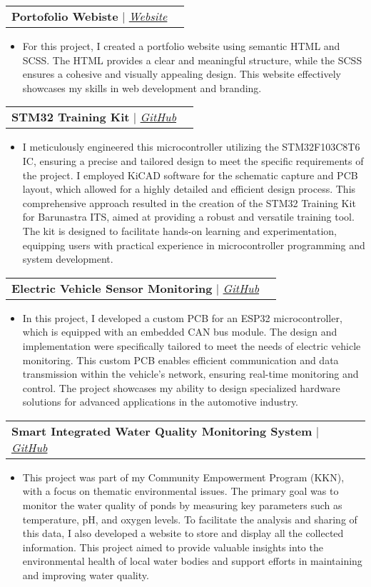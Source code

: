 \documentclass[letterpaper,11pt]{article}
\makeatletter
\newcommand{\resumeItem}[1]{
  \item\small{
    {#1 \vspace{-2pt}}
  }
}
\newcommand{\resumeProjectHeading}[2]{
    \vspace{-2pt}\item
    \begin{tabular*}{0.97\textwidth}{l@{\extracolsep{\fill}}r}
      \small#1 & #2 \\
    \end{tabular*}\vspace{-7pt}
}
\newcommand{\resumeItemListStart}{\begin{itemize}}
\newcommand{\resumeItemListEnd}{\end{itemize}\vspace{-5pt}}
\makeatother
\begin{document}
      \resumeProjectHeading
        {\textbf{Portofolio Webiste} $|$ \emph{\href{https://robotjaol.vercel.app/}{\color{blue}Website}}}{}
          \resumeItemListStart
            \resumeItem{For this project, I created a portfolio website using semantic HTML and SCSS. The HTML provides a clear and meaningful structure, while the SCSS ensures a cohesive and visually appealing design. This website effectively showcases my skills in web development and branding.}
          \resumeItemListEnd
      
      \resumeProjectHeading
        {\textbf{STM32 Training Kit} $|$ \emph{\href{https://github.com/robotjaol/STM32_Training_Kit}{\color{blue}GitHub}}}{}
          \resumeItemListStart
            \resumeItem{I meticulously engineered this microcontroller utilizing the STM32F103C8T6 IC, ensuring a precise and tailored design to meet the specific requirements of the project. I employed KiCAD software for the schematic capture and PCB layout, which allowed for a highly detailed and efficient design process. This comprehensive approach resulted in the creation of the STM32 Training Kit for Barunastra ITS, aimed at providing a robust and versatile training tool. The kit is designed to facilitate hands-on learning and experimentation, equipping users with practical experience in microcontroller programming and system development.}
          \resumeItemListEnd
          
     \resumeProjectHeading
        {\textbf{Electric Vehicle Sensor Monitoring} $|$ \emph{\href{https://github.com/robotjaol/esp32_breakout_board}{\color{blue}GitHub}}}{}
          \resumeItemListStart
            \resumeItem{In this project, I developed a custom PCB for an ESP32 microcontroller, which is equipped with an embedded CAN bus module. The design and implementation were specifically tailored to meet the needs of electric vehicle monitoring. This custom PCB enables efficient communication and data transmission within the vehicle's network, ensuring real-time monitoring and control. The project showcases my ability to design specialized hardware solutions for advanced applications in the automotive industry.}
          \resumeItemListEnd
          
      \resumeProjectHeading
        {\textbf{Smart Integrated Water Quality Monitoring System} $|$ \emph{\href{https://github.com/robotjaol/kkn_project}{\color{blue}GitHub}}}{}
          \resumeItemListStart
            \resumeItem{This project was part of my Community Empowerment Program (KKN), with a focus on thematic environmental issues. The primary goal was to monitor the water quality of ponds by measuring key parameters such as temperature, pH, and oxygen levels. To facilitate the analysis and sharing of this data, I also developed a website to store and display all the collected information. This project aimed to provide valuable insights into the environmental health of local water bodies and support efforts in maintaining and improving water quality.}
          \resumeItemListEnd
\end{document}
